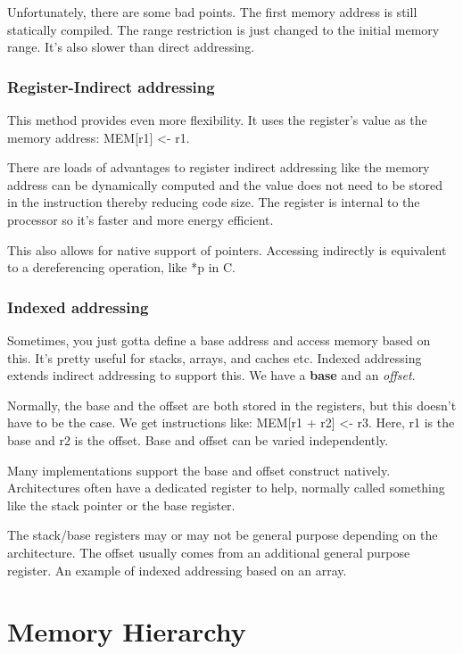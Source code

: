 \documentclass[11pt,a4paper,titlepage,dvipsnames,cmyk]{scrartcl}
\begin{document}
Unfortunately, there are some bad points. The first memory address is
still statically compiled. The range restriction is just changed to the
initial memory range. It's also slower than direct addressing.

\subsubsection{Register-Indirect addressing}%
\label{ssub:register-indirect}

This method provides even more flexibility. It uses the register's value
as the memory address: MEM[r1] <- r1.

There are loads of advantages to register indirect addressing like the
memory address can be dynamically computed and the value does not need to
be stored in the instruction thereby reducing code size. The register is
internal to the processor so it's faster and more energy efficient.

This also allows for native support of pointers. Accessing indirectly is
equivalent to a dereferencing operation, like *p in C.

\subsubsection{Indexed addressing}%
\label{ssub:indexed}
Sometimes, you just gotta define a base address and access memory based on
this. It's pretty useful for stacks, arrays, and caches etc. Indexed
addressing extends indirect addressing to support this. We have a
\textbf{base} and an \textit{offset}.

Normally, the base and the offset are both stored in the registers, but
this doesn't have to be the case. We get instructions like: MEM[r1 + r2]
<- r3. Here, r1 is the base and r2 is the offset. Base and offset can be
varied independently.

Many implementations support the base and offset construct natively.
Architectures often have a dedicated register to help, normally called
something like the stack pointer or the base register.

The stack/base registers may or may not be general purpose depending on
the architecture. The offset usually comes from an additional general
purpose register. An example of indexed addressing based on an array. 

\section{Memory Hierarchy}%
\label{sec:memory-hierarchy}
\end{document}
